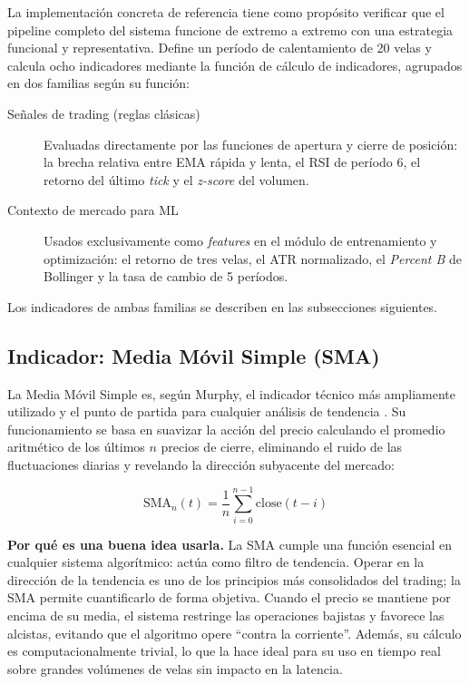 La implementación concreta de referencia tiene como propósito verificar que el pipeline completo del sistema funcione de extremo a extremo con una estrategia funcional y representativa. Define un período de calentamiento de 20 velas y calcula ocho indicadores mediante la función de cálculo de indicadores, agrupados en dos familias según su función:

\begin{description}
    \item[Señales de trading (reglas clásicas)] Evaluadas directamente por las funciones de apertura y cierre de posición: la brecha relativa entre EMA rápida y lenta, el RSI de período 6, el retorno del último \textit{tick} y el \textit{z-score} del volumen.
    \item[Contexto de mercado para ML] Usados exclusivamente como \textit{features} en el módulo de entrenamiento y optimización: el retorno de tres velas, el ATR normalizado, el \textit{Percent B} de Bollinger y la tasa de cambio de 5 períodos.
\end{description}

Los indicadores de ambas familias se describen en las subsecciones siguientes.

\subsection{Indicador: Media Móvil Simple (SMA)}

La Media Móvil Simple es, según Murphy, el indicador técnico más ampliamente utilizado y el punto de partida para cualquier análisis de tendencia \parencite{murphy_technical_1999}. Su funcionamiento se basa en suavizar la acción del precio calculando el promedio aritmético de los últimos $n$ precios de cierre, eliminando el ruido de las fluctuaciones diarias y revelando la dirección subyacente del mercado:

$$\text{SMA}_n(t) = \frac{1}{n} \sum_{i=0}^{n-1} \text{close}(t-i)$$

\textbf{Por qué es una buena idea usarla.} La SMA cumple una función esencial en cualquier sistema algorítmico: actúa como filtro de tendencia. Operar en la dirección de la tendencia es uno de los principios más consolidados del trading; la SMA permite cuantificarlo de forma objetiva. Cuando el precio se mantiene por encima de su media, el sistema restringe las operaciones bajistas y favorece las alcistas, evitando que el algoritmo opere ``contra la corriente''. Además, su cálculo es computacionalmente trivial, lo que la hace ideal para su uso en tiempo real sobre grandes volúmenes de velas sin impacto en la latencia.

